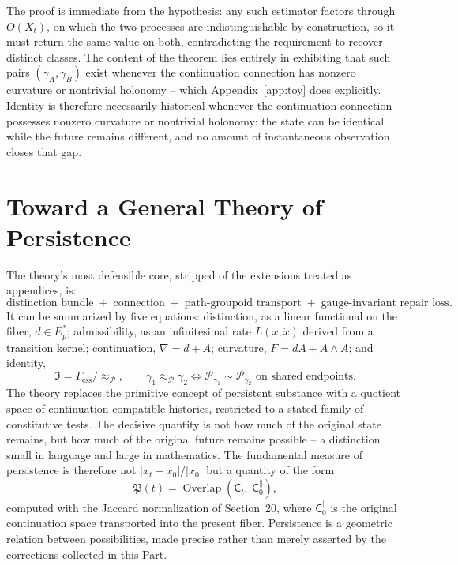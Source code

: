 \documentclass[11pt]{article}
\newcommand{\C}{\mathsf{C}}
\begin{document}
The proof is immediate from the hypothesis: any such estimator factors through $O(X_t)$, on which the two processes are indistinguishable by construction, so it must return the same value on both, contradicting the requirement to recover distinct classes. The content of the theorem lies entirely in exhibiting that such pairs $(\gamma_A, \gamma_B)$ exist whenever the continuation connection has nonzero curvature or nontrivial holonomy -- which Appendix~\ref{app:toy} does explicitly. Identity is therefore necessarily historical whenever the continuation connection possesses nonzero curvature or nontrivial holonomy: the state can be identical while the future remains different, and no amount of instantaneous observation closes that gap.

\section{Toward a General Theory of Persistence}

The theory's most defensible core, stripped of the extensions treated as appendices, is:
\[
\text{distinction bundle} \;+\; \text{connection} \;+\; \text{path-groupoid transport} \;+\; \text{gauge-invariant repair loss}.
\]
It can be summarized by five equations: distinction, as a linear functional on the fiber, $d \in E_p^\ast$; admissibility, as an infinitesimal rate $L(x,\dot x)$ derived from a transition kernel; continuation, $\nabla = d + A$; curvature, $F = dA + A \wedge A$; and identity,
\[
\mathfrak{I} = \Gamma_{\mathrm{ess}} / {\approx_{\mathcal{P}}}, \qquad \gamma_1 \approx_{\mathcal{P}} \gamma_2 \iff \mathcal{P}_{\gamma_1} \sim \mathcal{P}_{\gamma_2} \text{ on shared endpoints}.
\]
The theory replaces the primitive concept of persistent substance with a quotient space of continuation-compatible histories, restricted to a stated family of constitutive tests. The decisive quantity is not how much of the original state remains, but how much of the original future remains possible -- a distinction small in language and large in mathematics. The fundamental measure of persistence is therefore not $|x_t - x_0| / |x_0|$ but a quantity of the form
\[
\mathfrak{P}(t) = \operatorname{Overlap}\left( \C_t,\ \C_0^{\parallel} \right),
\]
computed with the Jaccard normalization of Section~20, where $\C_0^{\parallel}$ is the original continuation space transported into the present fiber. Persistence is a geometric relation between possibilities, made precise rather than merely asserted by the corrections collected in this Part.
\end{document}

